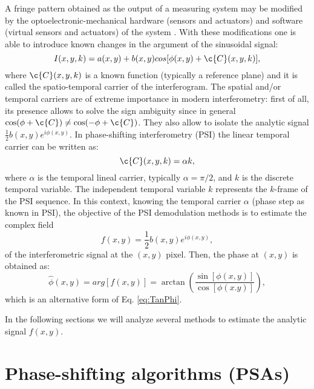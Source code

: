 A fringe pattern obtained as the output of a measuring system may be modified
by the optoelectronic-mechanical hardware (sensors and actuators) and software
(virtual sensors and actuators) of the system \cite{Kujawinska2006}. With these 
modifications one is able to introduce known changes in the argument of the 
sinusoidal signal:
\begin{equation}\label{eq:FringePatternTemporal}
 I(x,y,k)=a(x,y)+b(x,y)cos[\phi(x,y) + \c{C}(x,y,k)],
\end{equation}
where $\c{C}(x,y,k)$ is a known function (typically a reference plane) and it is 
called the spatio-temporal carrier of the interferogram. The spatial and/or 
temporal carriers are of extreme importance in modern interferometry: first of 
all, its presence allows to solve the sign ambiguity since in general 
$\cos(\phi+\c{C})\not=\cos(-\phi+\c{C})$. They also allow to isolate the analytic 
signal
$\frac{1}{2} b(x,y)e^{i \phi(x,y)}$. In phase-shifting interferometry (PSI) the
linear temporal carrier can be written as:
\begin{equation}\label{PSIcarrier}
 \c{C}(x,y,k)=\alpha k,
\end{equation}
where $\alpha$ is the temporal lineal carrier, typically $\alpha=\pi/2$, and $k$
is the discrete temporal variable. The independent temporal variable $k$ represents
the $k$-frame of the PSI sequence. In this context, knowing the temporal carrier 
$\alpha$ (phase step as known in PSI), the objective of the PSI demodulation 
methods is to estimate the complex field
\begin{equation}\label{eq:Complexfield}
 f(x,y)=\frac{1}{2}b(x,y)e^{i\phi(x,y)},
\end{equation}
of the interferometric signal at the $(x,y)$ pixel. Then, the phase at $(x,y)$ 
is obtained as:
\begin{equation}\label{eq:PSIphase}
  \hat{\phi}(x,y)=arg[f(x,y)]=\arctan\left(\frac{\sin[\phi(x,y)]}{\cos[\phi(x.y)]}
\right),
\end{equation}
which is an alternative form of Eq. \eqref{eq:TanPhi}.

In the following sections we will analyze several methods to estimate the 
analytic signal $f(x,y)$.

\section{Phase-shifting algorithms (PSAs)}


